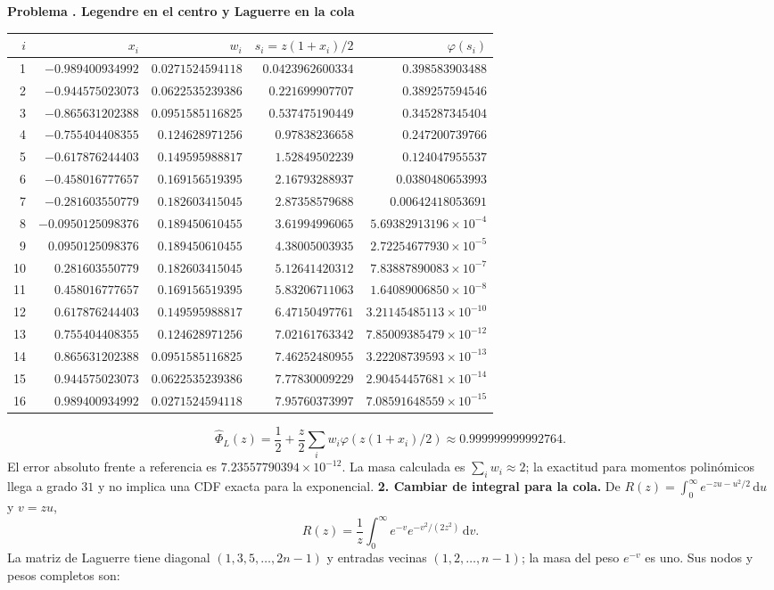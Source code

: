 \documentclass[11pt,a4paper]{article}
\newcommand{\dd}{\,\mathrm d}
\theoremstyle{definition}
\newcounter{problema}
\newenvironment{resuelto}[1]{\refstepcounter{problema}\par\medskip\Needspace{6\baselineskip}\textbf{Problema \theproblema. #1}\par}{\par\medskip}
\begin{document}
\begin{resuelto}{Legendre en el centro y Laguerre en la cola}
\begin{center}\small\begin{tabular}{rrrrr}
\toprule
$i$&$x_i$&$w_i$&$s_i=z(1+x_i)/2$&$\varphi(s_i)$\\
\midrule
1&$-0.989400934992$&$0.0271524594118$&$0.0423962600334$&$0.398583903488$\\
2&$-0.944575023073$&$0.0622535239386$&$0.221699907707$&$0.389257594546$\\
3&$-0.865631202388$&$0.0951585116825$&$0.537475190449$&$0.345287345404$\\
4&$-0.755404408355$&$0.124628971256$&$0.97838236658$&$0.247200739766$\\
5&$-0.617876244403$&$0.149595988817$&$1.52849502239$&$0.124047955537$\\
6&$-0.458016777657$&$0.169156519395$&$2.16793288937$&$0.0380480653993$\\
7&$-0.281603550779$&$0.182603415045$&$2.87358579688$&$0.00642418053691$\\
8&$-0.0950125098376$&$0.189450610455$&$3.61994996065$&$5.69382913196\times10^{-4}$\\
9&$0.0950125098376$&$0.189450610455$&$4.38005003935$&$2.72254677930\times10^{-5}$\\
10&$0.281603550779$&$0.182603415045$&$5.12641420312$&$7.83887890083\times10^{-7}$\\
11&$0.458016777657$&$0.169156519395$&$5.83206711063$&$1.64089006850\times10^{-8}$\\
12&$0.617876244403$&$0.149595988817$&$6.47150497761$&$3.21145485113\times10^{-10}$\\
13&$0.755404408355$&$0.124628971256$&$7.02161763342$&$7.85009385479\times10^{-12}$\\
14&$0.865631202388$&$0.0951585116825$&$7.46252480955$&$3.22208739593\times10^{-13}$\\
15&$0.944575023073$&$0.0622535239386$&$7.77830009229$&$2.90454457681\times10^{-14}$\\
16&$0.989400934992$&$0.0271524594118$&$7.95760373997$&$7.08591648559\times10^{-15}$\\
\bottomrule\end{tabular}\end{center}
\[
\widehat\Phi_L(z)=\frac12+\frac z2\sum_iw_i\varphi(z(1+x_i)/2)\approx0.999999999992764.
\]
El error absoluto frente a referencia es $7.23557790394\times10^{-12}$. La masa calculada es $\sum_iw_i\approx2$; la exactitud para momentos polinómicos llega a grado $31$ y no implica una CDF exacta para la exponencial.
\textbf{2. Cambiar de integral para la cola.} De $R(z)=\int_0^\infty e^{-zu-u^2/2}\dd u$ y $v=zu$,
\[
R(z)=\frac1z\int_0^\infty e^{-v}e^{-v^2/(2z^2)}\dd v.
\]
La matriz de Laguerre tiene diagonal $(1,3,5,\ldots,2n-1)$ y entradas vecinas $(1,2,\ldots,n-1)$; la masa del peso $e^{-v}$ es uno. Sus nodos y pesos completos son:


\end{resuelto}
\end{document}
